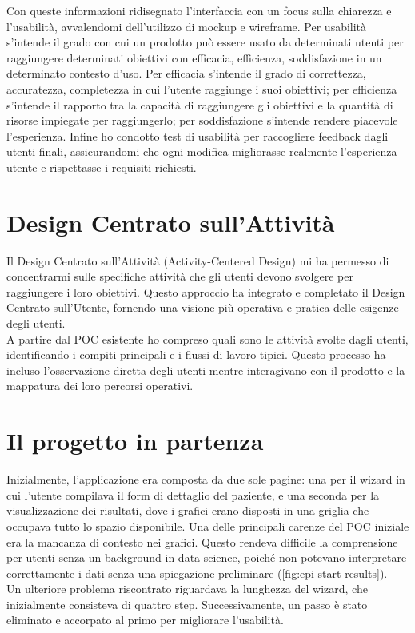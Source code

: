 \noindent Con queste informazioni ridisegnato l'interfaccia con un focus sulla chiarezza e l'usabilità, avvalendomi dell'utilizzo di mockup e wireframe. Per usabilità s'intende il grado con cui un prodotto può essere usato da determinati  utenti per raggiungere determinati obiettivi con efficacia, efficienza, soddisfazione in un determinato contesto d'uso. Per efficacia s'intende il grado di correttezza, accuratezza, completezza in cui l'utente raggiunge i suoi obiettivi; per efficienza s'intende il rapporto tra la capacità di raggiungere gli obiettivi e la quantità di risorse impiegate per raggiungerlo; per soddisfazione s'intende rendere piacevole l'esperienza.
Infine ho condotto test di usabilità per raccogliere feedback dagli utenti finali, assicurandomi che ogni modifica migliorasse realmente l'esperienza utente e rispettasse i requisiti richiesti.

\section{Design Centrato sull'Attività}

Il Design Centrato sull'Attività (Activity-Centered Design) mi ha permesso di concentrarmi sulle specifiche attività che gli utenti devono svolgere per raggiungere i loro obiettivi. Questo approccio ha integrato e completato il Design Centrato sull'Utente, fornendo una visione più operativa e pratica delle esigenze degli utenti.\\
A partire dal POC esistente ho compreso quali sono le attività svolte dagli utenti, identificando i compiti principali e i flussi di lavoro tipici. Questo processo ha incluso l'osservazione diretta degli utenti mentre interagivano con il prodotto e la mappatura dei loro percorsi operativi.\\


\section{Il progetto in partenza}
Inizialmente, l'applicazione era composta da due sole pagine: una per il wizard in cui l'utente compilava il form di dettaglio del paziente, e una seconda per la visualizzazione dei risultati, dove i grafici erano disposti in una griglia che occupava tutto lo spazio disponibile. Una delle principali carenze del POC iniziale era la mancanza di contesto nei grafici. Questo rendeva difficile la comprensione per utenti senza un background in data science, poiché non potevano interpretare correttamente i dati senza una spiegazione preliminare (\ref{fig:epi-start-results}).\\
Un ulteriore problema riscontrato riguardava la lunghezza del wizard, che inizialmente consisteva di quattro step. Successivamente, un passo è stato eliminato e accorpato al primo per migliorare l'usabilità.

